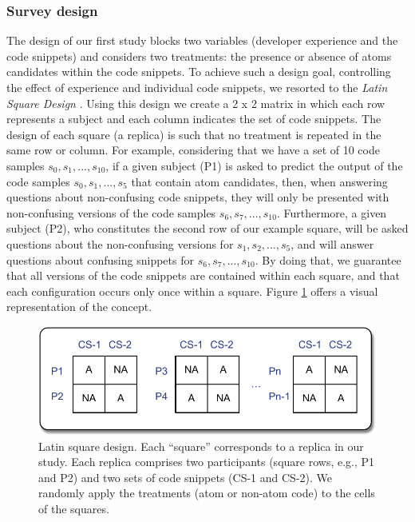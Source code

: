 \subsubsection*{Survey design} 

The design of our first study blocks two variables
(developer experience and the code snippets) and
considers two treatments: the presence or absence of 
atoms candidates within the code snippets. 
To achieve such a design goal, controlling the effect of experience and individual code snippets, we resorted to the \textit{Latin Square Design} \cite{Hunter-Experimenters}. Using this design we create a 2 x 2 matrix in which each row represents a subject and each column indicates the set of code snippets. The design of each square (a replica) is such that no treatment is repeated in the same row or column. For example, considering that we have a set of 10
code samples $s_0, s_1, ..., s_{10}$, if a given subject (P1) is asked to predict the output of the code samples $s_0, s_1, ..., s_5$ that contain atom candidates, then, when answering questions about non-confusing code snippets, they will only be presented with non-confusing versions of the code samples $s_6, s_7,..., s_{10}$. Furthermore, a given subject (P2), who constitutes the second row of our example square, will be asked questions about the non-confusing versions for $s_1, s_2, ..., s_5$, and will answer questions about confusing snippets for $s_6, s_7,..., s_{10}$. By doing that, we guarantee that all versions of the code snippets are contained within each square, and that each configuration occurs only once within a square. Figure \ref{fig:latinsquare} offers a visual representation of the concept.

  \begin{figure}[htb!]
      \noindent
      \centering
      \includegraphics[scale=.50]{images/latin-square.pdf}
      \caption{Latin square design. Each ``square'' corresponds to 
      a replica in our study. Each replica comprises two participants (square rows, e.g., P1 and P2) 
      and two sets of code snippets (CS-1 and CS-2). We randomly apply the 
      treatments (atom or non-atom code) to the cells of the squares.} 
      \label{fig:latinsquare}
  \end{figure}


